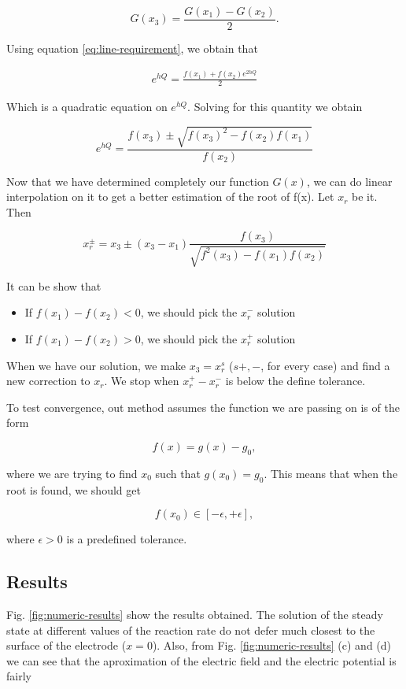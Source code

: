 \begin{equation}
G(x_3) = \frac{G(x_1)-G(x_2)}{2}.
\label{eq:line-requirement}
\end{equation}

Using equation \ref{eq:line-requirement}, we obtain that

\begin{eqnarray}
e^{hQ} = \frac{f(x_1)+f(x_2)e^{2hQ}}{2}
\end{eqnarray}

Which is a quadratic equation on $e^{hQ}$. Solving for this quantity we obtain

\begin{equation}
e^{hQ} = \frac{f(x_3)\pm\sqrt{f(x_3)^2-f(x_2)f(x_1)}}{f(x_2)}
\end{equation}

Now that we have determined completely our function $G(x)$, we can do linear interpolation on it to get a better estimation of the root of f(x). Let $x_r$  be it. Then

$$x_r^{\pm} = x_3 \pm (x_3-x_1)\frac{f(x_3)}{\sqrt{f^2(x_3)-f(x_1)f(x_2)}}$$

It can be show that 
\begin{itemize}
\item If $f(x_1)-f(x_2) < 0$, we should pick the $x_r^-$ solution
\item If $f(x_1)-f(x_2) > 0$, we should pick the $x_r^+$ solution
\end{itemize}

When we have our solution, we make $x_3 = x_r^{s}$ ($s+,-$, for every case) and find a new correction to $x_r$. We stop when $x_r^+-x_r^-$ is below the define tolerance.

To test convergence, out method assumes the function we are passing on is of the form

$$f(x) = g(x) -g_0,$$

where we are trying to find $x_0$ such that $g(x_0) = g_0$. This means that when the root is found, we should get 

$$f(x_0) \in [-\epsilon,+\epsilon],$$

where $\epsilon>0$ is a predefined tolerance.


\newpage
\subsection{Results}

Fig. \ref{fig:numeric-results} show the results obtained. The solution of the steady state at different values of the reaction rate do not defer much closest to the surface of the electrode ($x=0$). Also, from Fig. \ref{fig:numeric-results} (c) and (d) we can see that the aproximation of the electric field and the electric potential is fairly 

